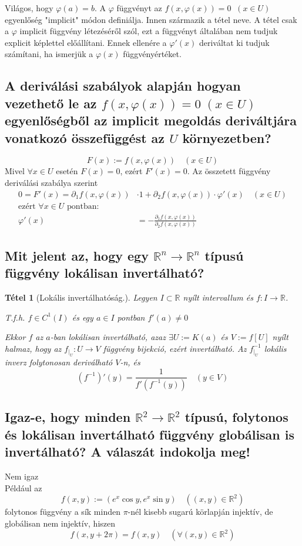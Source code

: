 \documentclass[12pt,a4paper]{article}
\newcommand{\R}{\mathbb{R}}
\newcommand{\f}{\varphi}
\newtheorem{tet}{Tétel}[section]
\begin{document}
Világos, hogy $\f(a) = b$. A $\f$ függvényt az $f(x, \f(x)) = 0 \; \; (x \in U)$ egyenlőség "implicit" módon definiálja. Innen származik a tétel neve.
A tétel csak a $\f$ implicit függvény létezéséről szól, ezt a függvényt általában nem tudjuk explicit képlettel előállítani. Ennek ellenére a $\f'(x)$ deriváltat ki tudjuk számítani, ha ismerjük a $\f(x)$ függvényértéket.
\subsection{A deriválási szabályok alapján hogyan vezethető le az $f(x, \f(x)) = 0 \; (x \in U)$ egyenlőségből az implicit megoldás deriváltjára vonatkozó összefüggést az $U$ környezetben?}
\[
F(x) := f(x,\f(x)) \quad (x \in U)
\]
Mivel $\forall x \in U $  esetén $F(x) = 0$, ezért $F'(x) = 0$. Az összetett függvény deriválási szabálya szerint
\begin{align*}
0 = F'(x) = \partial_1 f (x, \f(x)) &\cdot 1 + \partial_2 f(x,\f(x)) \cdot \f'(x) \quad (x\in U) \\
\text{ezért } \forall x \in U \text{ pontban:} \\
\f'(x) &= - \frac{\partial_1 f (x,\f(x))}{\partial_2 f(x,\f(x))}
\end{align*}
\subsection{Mit jelent az, hogy egy $\R^n \rightarrow \R^n$ típusú függvény lokálisan invertálható?}
\begin{tet}[Lokális invertálhatóság.]
Legyen $I \subset \R$ nyílt intervallum és $f : I \rightarrow \R$.

T.f.h. $f \in C^1(I)$ és egy $a \in I$ pontban $f'(a) \neq 0$

Ekkor $f$ az $a$-ban lokálisan invertálható, azaz $\exists U := K(a)$ és $V:= f[U]$ nyílt halmaz, hogy az  $f_{\mid_U} : U \rightarrow V$ függvény bijekció, ezért invertálható. Az $f_{\mid_U}^{-1}$ lokális inverz folytonosan deriválható $V$-n, és
\[
(f^{-1})' (y) = \frac{1}{f'(f^{-1}(y))} \quad (y \in V)
\]
\end{tet}
\subsection{Igaz-e, hogy minden $\R^2 \rightarrow \R^2$ típusú, folytonos és lokálisan invertálható függvény globálisan is invertálható? A válaszát indokolja meg!}
Nem igaz\\
Például az 
\[
f(x,y) := (e^x \cos y, e^x \sin y) \quad ((x,y)\in \R^2)
\]
folytonos függvény a sík minden $\pi$-nél kisebb sugarú körlapján injektív, de globálisan nem injektív, hiszen
\[
f(x,y+2\pi) = f(x,y) \quad (\forall (x,y)\in \R^2)
\]
\end{document}
